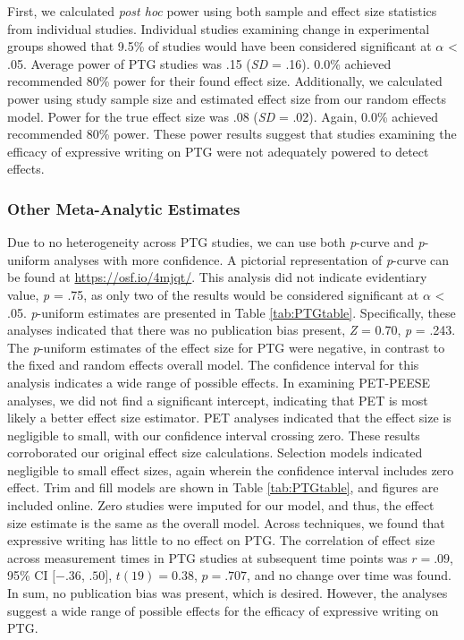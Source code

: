 \documentclass[,man]{apa6}
\begin{document}
First, we calculated \emph{post hoc} power using both sample and effect size statistics from individual studies. Individual studies examining change in experimental groups showed that 9.5\% of studies would have been considered significant at \(\alpha\) \textless{} .05. Average power of PTG studies was .15 (\emph{SD} = .16). 0.0\% achieved recommended 80\% power for their found effect size. Additionally, we calculated power using study sample size and estimated effect size from our random effects model. Power for the true effect size was .08 (\emph{SD} = .02). Again, 0.0\% achieved recommended 80\% power. These power results suggest that studies examining the efficacy of expressive writing on PTG were not adequately powered to detect effects.

\hypertarget{other-meta-analytic-estimates-1}{%
\subsubsection{Other Meta-Analytic Estimates}\label{other-meta-analytic-estimates-1}}

Due to no heterogeneity across PTG studies, we can use both \emph{p}-curve and \emph{p}-uniform analyses with more confidence. A pictorial representation of \emph{p}-curve can be found at \url{https://osf.io/4mjqt/}. This analysis did not indicate evidentiary value, \emph{p} = .75, as only two of the results would be considered significant at \(\alpha\) \textless{} .05. \emph{p}-uniform estimates are presented in Table \ref{tab:PTGtable}. Specifically, these analyses indicated that there was no publication bias present, \emph{Z} = 0.70, \emph{p} = .243. The \emph{p}-uniform estimates of the effect size for PTG were negative, in contrast to the fixed and random effects overall model. The confidence interval for this analysis indicates a wide range of possible effects. In examining PET-PEESE analyses, we did not find a significant intercept, indicating that PET is most likely a better effect size estimator. PET analyses indicated that the effect size is negligible to small, with our confidence interval crossing zero. These results corroborated our original effect size calculations. Selection models indicated negligible to small effect sizes, again wherein the confidence interval includes zero effect. Trim and fill models are shown in Table \ref{tab:PTGtable}, and figures are included online. Zero studies were imputed for our model, and thus, the effect size estimate is the same as the overall model. Across techniques, we found that expressive writing has little to no effect on PTG. The correlation of effect size across measurement times in PTG studies at subsequent time points was \(r = .09\), 95\% CI \([-.36\), \(.50]\), \(t(19) = 0.38\), \(p = .707\), and no change over time was found. In sum, no publication bias was present, which is desired. However, the analyses suggest a wide range of possible effects for the efficacy of expressive writing on PTG.
\end{document}
